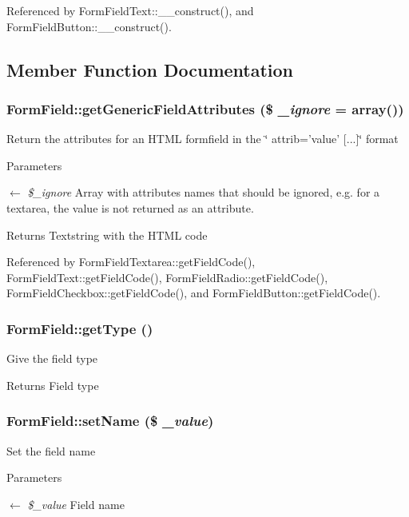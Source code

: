 Referenced by FormFieldText::\_\-\_\-construct(), and FormFieldButton::\_\-\_\-construct().



\subsection{Member Function Documentation}
\subsubsection[{getGenericFieldAttributes}]{\setlength{\rightskip}{0pt plus 5cm}FormField::getGenericFieldAttributes (\$ {\em \_\-ignore} = {\ttfamily array()})}\label{classFormField_a9f9d136ba8b4a793f22370aff43d592d}
Return the attributes for an HTML formfield in the \char`\"{} attrib='value' \mbox{[}...\mbox{]}\char`\"{} format


\begin{DoxyParams}{Parameters}
\item[\mbox{$\leftarrow$} {\em \$\_\-ignore}]Array with attributes names that should be ignored, e.g. for a textarea, the value is not returned as an attribute. \end{DoxyParams}
\begin{DoxyReturn}{Returns}
Textstring with the HTML code 
\end{DoxyReturn}


Referenced by FormFieldTextarea::getFieldCode(), FormFieldText::getFieldCode(), FormFieldRadio::getFieldCode(), FormFieldCheckbox::getFieldCode(), and FormFieldButton::getFieldCode().

\subsubsection[{getType}]{\setlength{\rightskip}{0pt plus 5cm}FormField::getType ()}\label{classFormField_a1f64b737bccb6b2827f8c5665b9920c7}
Give the field type \begin{DoxyReturn}{Returns}
Field type 
\end{DoxyReturn}
\subsubsection[{setName}]{\setlength{\rightskip}{0pt plus 5cm}FormField::setName (\$ {\em \_\-value})}\label{classFormField_ad57e32bd53170af060e869b3b60f0ef7}
Set the field name 
\begin{DoxyParams}{Parameters}
\item[\mbox{$\leftarrow$} {\em \$\_\-value}]Field name \end{DoxyParams}
